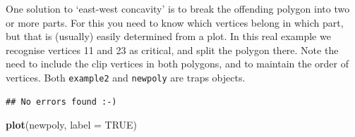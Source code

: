 \documentclass[
]{book}
\newenvironment{Shaded}{\begin{snugshade}}{\end{snugshade}}
\newcommand{\AttributeTok}[1]{\textcolor[rgb]{0.13,0.29,0.53}{#1}}
\newcommand{\ConstantTok}[1]{\textcolor[rgb]{0.56,0.35,0.01}{#1}}
\newcommand{\DecValTok}[1]{\textcolor[rgb]{0.00,0.00,0.81}{#1}}
\newcommand{\FloatTok}[1]{\textcolor[rgb]{0.00,0.00,0.81}{#1}}
\newcommand{\FunctionTok}[1]{\textcolor[rgb]{0.13,0.29,0.53}{\textbf{#1}}}
\newcommand{\NormalTok}[1]{#1}
\newcommand{\OtherTok}[1]{\textcolor[rgb]{0.56,0.35,0.01}{#1}}
\newcommand{\SpecialCharTok}[1]{\textcolor[rgb]{0.81,0.36,0.00}{\textbf{#1}}}
\newcommand{\StringTok}[1]{\textcolor[rgb]{0.31,0.60,0.02}{#1}}
\begin{document}
One solution to `east-west concavity' is to break the offending polygon into two or more parts. For this you need to know which vertices belong in which part, but that is (usually) easily determined from a plot. In this real example we recognise vertices 11 and 23 as critical, and split the polygon there. Note the need to include the clip vertices in both polygons, and to maintain the order of vertices. Both \texttt{example2} and \texttt{newpoly} are traps objects.

\begin{Shaded}
\end{Shaded}

\begin{verbatim}
## No errors found :-)
\end{verbatim}

\begin{Shaded}
\begin{Highlighting}[]
\FunctionTok{plot}\NormalTok{(newpoly, }\AttributeTok{label =} \ConstantTok{TRUE}\NormalTok{)}
\end{Highlighting}
\end{Shaded}
\end{document}
